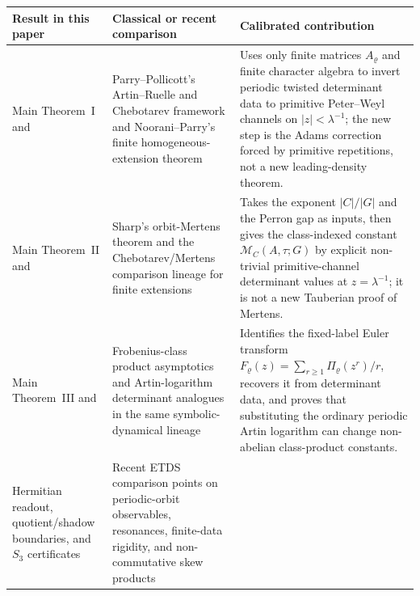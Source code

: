 \begin{table}[t]
  \centering
  \footnotesize
  \begin{tabular}{L{0.21\textwidth}L{0.34\textwidth}L{0.36\textwidth}}
    \toprule
    Result in this paper & Classical or recent comparison & Calibrated contribution \\
    \midrule
    Main Theorem~I and
      & Parry--Pollicott's Artin--Ruelle and Chebotarev framework and
        Noorani--Parry's finite homogeneous-extension theorem
        \cite{ParryPollicott1990Zeta,ParryPollicott1986Chebotarev,NooraniParry1992ChebotarevShifts}
      & Uses only finite matrices \(A_\varrho\) and finite character algebra to
        invert periodic twisted determinant data to primitive Peter--Weyl
        channels on \(|z|<\lambda^{-1}\); the new step is the Adams correction
        forced by primitive repetitions, not a new leading-density theorem. \\
    Main Theorem~II and
      & Sharp's orbit-Mertens theorem and the Chebotarev/Mertens comparison
        lineage for finite extensions
        \cite{Sharp1991Mertens,ParryPollicott1986Chebotarev,NooraniParry1992ChebotarevShifts,MeslizaNoorani1999FrobeniusMertens}
      & Takes the exponent \(|C|/|G|\) and the Perron gap as inputs, then gives
        the class-indexed constant \(\mathcal M_C(A,\tau;G)\) by explicit
        non-trivial primitive-channel determinant values at
        \(z=\lambda^{-1}\); it is not a new Tauberian proof of Mertens. \\
    Main Theorem~III and
      & Frobenius-class product asymptotics and Artin-logarithm determinant
        analogues in the same symbolic-dynamical lineage
        \cite{MeslizaNoorani1999FrobeniusMertens,ParryPollicott1990Zeta}
      & Identifies the fixed-label Euler transform
        \(F_\varrho(z)=\sum_{r\ge1}\Pi_\varrho(z^r)/r\), recovers it from
        determinant data, and proves that substituting the ordinary periodic
        Artin logarithm can change non-abelian class-product constants. \\
    Hermitian readout, quotient/shadow boundaries, and \(S_3\) certificates
      & Recent ETDS comparison points on periodic-orbit observables,
        resonances, finite-data rigidity, and non-commutative skew products

\end{tabular}
\end{table}
